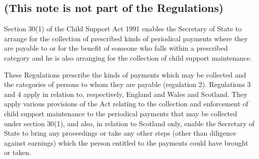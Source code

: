 \documentclass[a4paper]{article}
\newcommand{\parthead}{}
\begin{document}
\renewcommand\parthead{--- Explanatory Note}

\subsection*{(This note is not part of the Regulations)}

 Section 30(1) of the Child Support Act 1991 enables the Secretary of State to arrange for the collection of prescribed kinds of periodical payments where they are payable to or for the benefit of someone who falls within a prescribed category and he is also arranging for the collection of child support maintenance.

  These Regulations prescribe the kinds of payments which may be collected and the categories of persons to whom they are payable (regulation 2). Regulations 3 and 4 apply in relation to, respectively, England and Wales and Scotland. They apply various provisions of the Act relating to the collection and enforcement of child support maintenance to the periodical payments that may be collected under section 30(1), and also, in relation to Scotland only, enable the Secretary of State to bring any proceedings or take any other steps (other than diligence against earnings) which the person entitled to the payments could have brought or taken.
\end{document}
